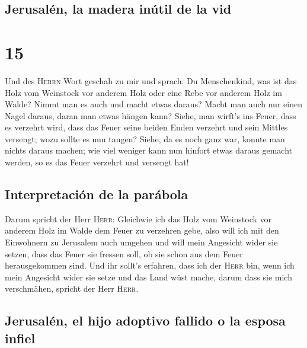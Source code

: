 \hypertarget{jerusaluxe9n-la-madera-inuxfatil-de-la-vid}{%
\subsection{Jerusalén, la madera inútil de la
vid}\label{jerusaluxe9n-la-madera-inuxfatil-de-la-vid}}

\hypertarget{section-14}{%
\section{15}\label{section-14}}

 Und des \textsc{Herrn} Wort geschah zu mir und sprach:
 Du Menschenkind, was ist das Holz vom Weinstock vor
anderem Holz oder eine Rebe vor anderem Holz im Walde? 
Nimmt man es auch und macht etwas daraus? Macht man auch nur einen Nagel
daraus, daran man etwas hängen kann?  Siehe, man wirft's
ins Feuer, dass es verzehrt wird, dass das Feuer seine beiden Enden
verzehrt und sein Mittles versengt; wozu sollte es nun taugen?
 Siehe, da es noch ganz war, konnte man nichts daraus
machen; wie viel weniger kann nun hinfort etwas daraus gemacht werden,
so es das Feuer verzehrt und versengt hat!

\hypertarget{interpretaciuxf3n-de-la-paruxe1bola}{%
\subsection{Interpretación de la
parábola}\label{interpretaciuxf3n-de-la-paruxe1bola}}

 Darum spricht der Herr \textsc{Herr}: Gleichwie ich das
Holz vom Weinstock vor anderem Holz im Walde dem Feuer zu verzehren
gebe, also will ich mit den Einwohnern zu Jerusalem auch umgehen
 und will mein Angesicht wider sie setzen, dass das Feuer
sie fressen soll, ob sie schon aus dem Feuer herausgekommen sind. Und
ihr sollt's erfahren, dass ich der \textsc{Herr} bin, wenn ich mein
Angesicht wider sie setze  und das Land wüst mache, darum
dass sie mich verschmähen, spricht der Herr \textsc{Herr}.

\hypertarget{jerusaluxe9n-el-hijo-adoptivo-fallido-o-la-esposa-infiel}{%
\subsection{Jerusalén, el hijo adoptivo fallido o la esposa
infiel}\label{jerusaluxe9n-el-hijo-adoptivo-fallido-o-la-esposa-infiel}}

